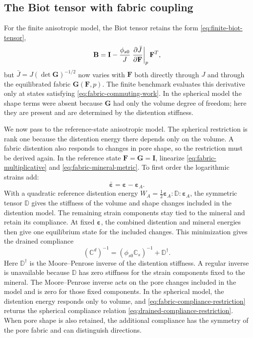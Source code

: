\subsection{The Biot tensor with fabric coupling}
\label{sec:fabric-biot}

For the finite anisotropic model, the Biot tensor retains the form
\eqref{eq:finite-biot-tensor},
\begin{equation}
 \mathbf B=\mathbf I-\frac{\phi_{s0}}J
   \left.\frac{\partial \bar J}{\partial \mathbf F}\right|_p\mathbf F^T,
 \label{eq:fabric-biot-tensor}
\end{equation}
but \(\bar J=J(\det\mathbf G)^{-1/2}\) now varies with \(\mathbf F\)
both directly through \(J\) and through the equilibrated fabric
\(\mathbf G(\mathbf F,p)\). The finite benchmark evaluates this derivative
only at states satisfying
\eqref{eq:fabric-commuting-work}. In the spherical model the shape terms were absent because
\(\mathbf G\) had only the volume degree of freedom; here they are present
and are determined by the distention stiffness.

We now pass to the reference-state anisotropic model. The spherical
restriction is rank one because the distention energy there
depends only on the volume. A fabric distention also responds to changes in
pore shape, so the restriction must be derived again. In
the reference state \(\mathbf F=\mathbf G=\mathbf I\), linearize
\eqref{eq:fabric-multiplicative} and \eqref{eq:fabric-mineral-metric}. To
first order the logarithmic strains add:
\begin{equation}
 \bar{\mathbf\varepsilon}=\mathbf\varepsilon-\mathbf\varepsilon_A.
 \label{eq:fabric-additive-strain}
\end{equation}
With a quadratic reference distention energy
\(W_A=\tfrac12\mathbf\varepsilon_A:\mathbb{D}:\mathbf\varepsilon_A\),
the symmetric tensor \(\mathbb D\) gives the stiffness of the volume and
shape changes included in the distention model. The remaining strain
components stay tied to the mineral and retain its compliance. At fixed
\(\mathbf\varepsilon\), the combined distention and mineral energies then
give one equilibrium state for the included changes. This minimization gives
the drained compliance
\begin{equation}
 (\mathbb{C}^d)^{-1}
 =(\phi_{s0}\mathbb{C}_s)^{-1}+\mathbb{D}^{\dagger}.
 \label{eq:fabric-compliance-restriction}
\end{equation}
Here \(\mathbb D^{\dagger}\) is the Moore--Penrose inverse of the
distention stiffness. A regular inverse is unavailable because \(\mathbb D\)
has zero stiffness for the strain components fixed to the mineral. The
Moore--Penrose inverse acts on the pore changes included in the model and is
zero for those fixed components.
In the spherical model, the distention energy responds only to volume, and
\eqref{eq:fabric-compliance-restriction} returns the spherical compliance
relation \eqref{eq:drained-compliance-restriction}. When pore shape is also
retained, the additional compliance has the symmetry of the pore fabric and
can distinguish directions.

